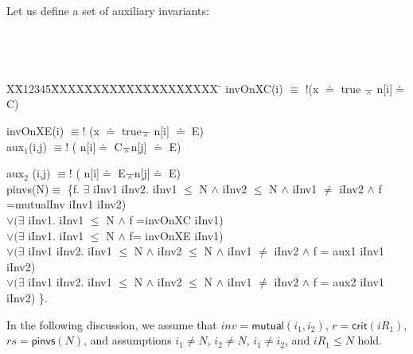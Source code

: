 \documentclass{llncs}
\newlength{\fminilength}
\newenvironment{fmini}[1][\linewidth]
  {\setlength{\fminilength}{#1\fboxsep-2\fboxrule}%
   \vspace{2ex}\noindent\begin{lrbox}{\fminibox}\begin{minipage}{\fminilength}%
   \mbox{ }\hfill\vspace{-2.5ex}}%
  {\end{minipage}\end{lrbox}\vspace{1ex}\hspace{0ex}%
   \framebox{\usebox{\fminibox}}}
\newenvironment{specification}
{\noindent\scriptsize
\tt\begin{fmini}\begin{tabbing}X\=X12345\=XXXX\=XXXX\=XXXX\=XXXX\=XXXX
\=\+\kill} {\end{tabbing}\normalfont\end{fmini}}
\def \eqc {\doteq }
\def \andc {\barwedge }
\def \negc {!}
\def \iInv {iInv}
\begin{document}
\begin{example}\label{example2}
Let us define a set of auxiliary invariants:

\begin{specification}
invOnXC(i)  $\equiv$ $\negc$(x $\doteq$ true $\andc$ n[i]$\doteq$ C)   \ \ \

invOnXE(i)   $\equiv \negc$ (x $\doteq$ true$\andc$ n[i] $\doteq$ E)  \\


aux$_1$(i,j)   $\equiv \negc$ ( n[i]$\doteq$ C$\andc$n[j] $\doteq$ E)   \ \ \

aux$_2$ (i,j) $\equiv \negc$  ( n[i]$\doteq$ E$\andc$n[j]$\doteq$ E)\\

  pinvs(N)$\equiv$ \{f. $\exists$ \iInv1 \iInv2. \iInv1 $\le$ N $\wedge$ \iInv2 $\le$ N $\wedge$ \iInv1 $\ne$ \iInv2 $\wedge$   f =mutualInv   \iInv1 \iInv2) \\
 $ \vee(\exists$ \iInv1. \iInv1 $\le$ N $\wedge$  f =invOnXC  \iInv1)   \\
$\vee(\exists$ \iInv1. \iInv1 $\le$ N $\wedge$  f= invOnXE \iInv1)    \\
$\vee(\exists$ \iInv1 \iInv2. \iInv1 $\le$ N $\wedge$ \iInv2 $\le$ N $\wedge$ \iInv1 $\ne$ \iInv2 $\wedge$ f =  aux1  \iInv1 \iInv2) \\
$\vee(\exists$ \iInv1 \iInv2. \iInv1 $\le$ N $\wedge$ \iInv2 $\le$ N $\wedge$ \iInv1 $\ne$ \iInv2 $\wedge$ f =  aux2  \iInv1 \iInv2) \}.

\end{specification}

In the following discussion, we assume that $inv=\mathsf{mutual} (i_1,i_2)$, $r=\mathsf{crit}(iR_1)$, $rs= \mathsf{pinvs} (N)$, and   assumptions  $i_1 \neq N$, $i_2 \neq N$, $i_1 \neq i_2$, and $iR_1 \leq N$ hold.

\begin{itemize}



\end{itemize}
\end{example}
\end{document}
